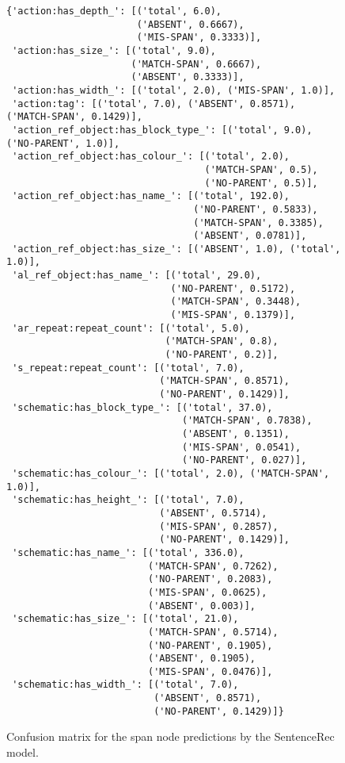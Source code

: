 \begin{figure}[t]
    \centering
    \begin{verbatim}
{'action:has_depth_': [('total', 6.0),
                       ('ABSENT', 0.6667),
                       ('MIS-SPAN', 0.3333)],
 'action:has_size_': [('total', 9.0),
                      ('MATCH-SPAN', 0.6667),
                      ('ABSENT', 0.3333)],
 'action:has_width_': [('total', 2.0), ('MIS-SPAN', 1.0)],
 'action:tag': [('total', 7.0), ('ABSENT', 0.8571), ('MATCH-SPAN', 0.1429)],
 'action_ref_object:has_block_type_': [('total', 9.0), ('NO-PARENT', 1.0)],
 'action_ref_object:has_colour_': [('total', 2.0),
                                   ('MATCH-SPAN', 0.5),
                                   ('NO-PARENT', 0.5)],
 'action_ref_object:has_name_': [('total', 192.0),
                                 ('NO-PARENT', 0.5833),
                                 ('MATCH-SPAN', 0.3385),
                                 ('ABSENT', 0.0781)],
 'action_ref_object:has_size_': [('ABSENT', 1.0), ('total', 1.0)],
 'al_ref_object:has_name_': [('total', 29.0),
                             ('NO-PARENT', 0.5172),
                             ('MATCH-SPAN', 0.3448),
                             ('MIS-SPAN', 0.1379)],
 'ar_repeat:repeat_count': [('total', 5.0),
                            ('MATCH-SPAN', 0.8),
                            ('NO-PARENT', 0.2)],
 's_repeat:repeat_count': [('total', 7.0),
                           ('MATCH-SPAN', 0.8571),
                           ('NO-PARENT', 0.1429)],
 'schematic:has_block_type_': [('total', 37.0),
                               ('MATCH-SPAN', 0.7838),
                               ('ABSENT', 0.1351),
                               ('MIS-SPAN', 0.0541),
                               ('NO-PARENT', 0.027)],
 'schematic:has_colour_': [('total', 2.0), ('MATCH-SPAN', 1.0)],
 'schematic:has_height_': [('total', 7.0),
                           ('ABSENT', 0.5714),
                           ('MIS-SPAN', 0.2857),
                           ('NO-PARENT', 0.1429)],
 'schematic:has_name_': [('total', 336.0),
                         ('MATCH-SPAN', 0.7262),
                         ('NO-PARENT', 0.2083),
                         ('MIS-SPAN', 0.0625),
                         ('ABSENT', 0.003)],
 'schematic:has_size_': [('total', 21.0),
                         ('MATCH-SPAN', 0.5714),
                         ('NO-PARENT', 0.1905),
                         ('ABSENT', 0.1905),
                         ('MIS-SPAN', 0.0476)],
 'schematic:has_width_': [('total', 7.0),
                          ('ABSENT', 0.8571),
                          ('NO-PARENT', 0.1429)]}

    \end{verbatim}
    \caption{Confusion matrix for the span node predictions by the SentenceRec model.}
    \label{fig:conf_int_senrec}
\end{figure}

